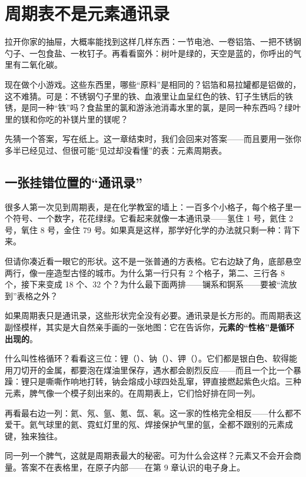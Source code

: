 \chapter{周期表不是元素通讯录}

\begin{kaichang}
拉开你家的抽屉，大概率能找到这样几样东西：一节电池、一卷铝箔、一把不锈钢勺子、一包食盐、一枚钉子。再看看窗外：树叶是绿的，天空是蓝的，你呼出的气里有二氧化碳。

现在做个小游戏。这些东西里，哪些“原料”是相同的？铝箔和易拉罐都是铝做的，这不难猜。可是：不锈钢勺子里的铁、血液里让血呈红色的铁、钉子生锈后的铁锈，是同一种“铁”吗？食盐里的氯和游泳池消毒水里的氯，是同一种东西吗？绿叶里的镁和你吃的补镁片里的镁呢？

先猜一个答案，写在纸上。这一章结束时，我们会回来对答案——而且要用一张你多半已经见过、但很可能“见过却没看懂”的表：元素周期表。
\end{kaichang}

\section{一张挂错位置的“通讯录”}

很多人第一次见到周期表，是在化学教室的墙上：一百多个小格子，每个格子里一个符号、一个数字，花花绿绿。它看起来就像一本通讯录——氢住 1 号，氦住 2 号，氧住 8 号，金住 79 号。如果真是这样，那学好化学的办法就只剩一种：背下来。

但请你凑近看一眼它的形状。这不是一张普通的方表格。它右边缺了角，底部悬空两行，像一座造型古怪的城市。为什么第一行只有 2 个格子，第二、三行各 8 个，接下来变成 18 个、32 个？为什么最下面两排——镧系和锕系——要被“流放到”表格之外？

如果周期表只是通讯录，这些形状完全没有必要。通讯录是长方形的。而周期表这副怪模样，其实是大自然亲手画的一张地图：它在告诉你，\textbf{元素的“性格”是循环出现的}。

什么叫性格循环？看看这三位：锂（）、钠（）、钾（）。它们都是银白色、软得能用刀切开的金属，都要泡在煤油里保存，遇水都会剧烈反应——而且一个比一个暴躁：锂只是嘶嘶作响地打转，钠会熔成小球四处乱窜，钾直接燃起紫色火焰。三种元素，脾气像一个模子刻出来的。在周期表上，它们恰好排在同一列。

再看最右边一列：氦、氖、氩、氪、氙、氡。这一家的性格完全相反——什么都不爱干。氦气球里的氦、霓虹灯里的氖、焊接保护气里的氩，全都不跟别的元素成键，独来独往。

同一列一个脾气，这就是周期表最大的秘密。可为什么会这样？元素又不会开会商量。答案不在表格里，在原子内部——在第 9 章认识的电子身上。

